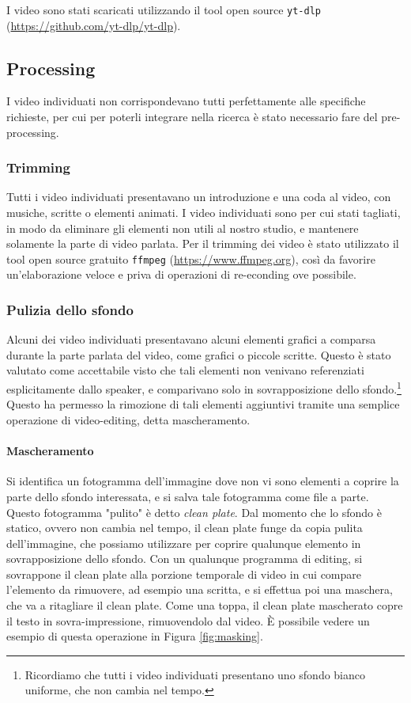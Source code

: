 I video sono stati scaricati utilizzando il tool open source \verb|yt-dlp| (\url{https://github.com/yt-dlp/yt-dlp}).

\subsection{Processing}

I video individuati non corrispondevano tutti perfettamente alle specifiche richieste, per cui per poterli integrare nella ricerca è stato necessario fare del pre-processing.

\subsubsection{Trimming}

Tutti i video individuati presentavano un introduzione e una coda al video, con musiche, scritte o elementi animati. I video individuati sono per cui stati tagliati, in modo da eliminare gli elementi non utili al nostro studio, e mantenere solamente la parte di video parlata. Per il trimming dei video è stato utilizzato il tool open source gratuito \verb|ffmpeg| (\url{https://www.ffmpeg.org}), così da favorire un'elaborazione veloce e priva di operazioni di re-econding ove possibile.

\subsubsection{Pulizia dello sfondo}

Alcuni dei video individuati presentavano alcuni elementi grafici a comparsa durante la parte parlata del video, come grafici o piccole scritte. Questo è stato valutato come accettabile visto che tali elementi non venivano referenziati esplicitamente dallo speaker, e comparivano solo in sovrapposizione dello sfondo.\footnote{Ricordiamo che tutti i video individuati presentano uno sfondo bianco uniforme, che non cambia nel tempo.} Questo ha permesso la rimozione di tali elementi aggiuntivi tramite una semplice operazione di video-editing, detta mascheramento.

\paragraph{Mascheramento}

Si identifica un fotogramma dell'immagine dove non vi sono elementi a coprire la parte dello sfondo interessata, e si salva tale fotogramma come file a parte. Questo fotogramma "pulito" è detto \textit{clean plate}. Dal momento che lo sfondo è statico, ovvero non cambia nel tempo, il clean plate funge da copia pulita dell'immagine, che possiamo utilizzare per coprire qualunque elemento in sovrapposizione dello sfondo. Con un qualunque programma di editing, si sovrappone il clean plate alla porzione temporale di video in cui compare l'elemento da rimuovere, ad esempio una scritta, e si effettua poi una maschera, che va a ritagliare il clean plate. Come una toppa, il clean plate mascherato copre il testo in sovra-impressione, rimuovendolo dal video. È possibile vedere un esempio di questa operazione in Figura \ref{fig:masking}.


